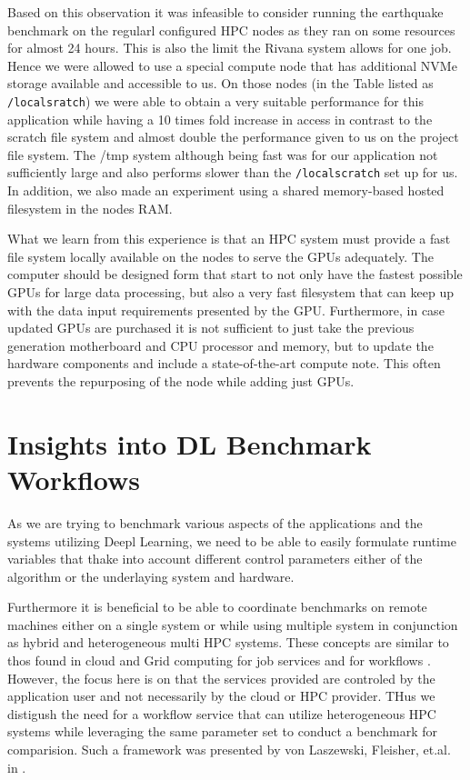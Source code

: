 \documentclass[utf8]{FrontiersinVancouver} %
\begin{document}
Based on this observation it was infeasible to consider running the
earthquake benchmark on the regularl configured HPC nodes as they ran
on some resources for almost 24 hours. This is also the limit the
Rivana system allows for one job. Hence we were allowed to use a
special compute node that has additional NVMe storage available and
accessible to us. On those nodes (in the Table listed as
\verb|/localsratch|) we were able to obtain a very suitable performance
for this application while having a 10 times fold increase in access in
contrast to the scratch file system and almost double the performance
given to us on the project file system. The /tmp system although being
fast was for our application not sufficiently large and also performs
slower than the \verb|/localscratch| set up for us. In addition, we
also made an experiment using a shared memory-based hosted filesystem
in the nodes RAM.

What we learn from this experience is that an HPC system must provide
a fast file system locally available on the nodes to serve the GPUs
adequately. The computer should be designed form that start to not
only have the fastest possible GPUs for large data processing, but
also a very fast filesystem that can keep up with the data input
requirements presented by the GPU. Furthermore, in case updated GPUs
are purchased it is not sufficient to just take the previous
generation motherboard and CPU processor and memory, but to update the
hardware components and include a state-of-the-art compute note. This
often prevents the repurposing of the node while adding just GPUs.

  


\section{Insights into DL Benchmark Workflows}
\label{sec:workflow-main}

As we are trying to benchmark various aspects of the applications and
the systems utilizing Deepl Learning, we need to be able to easily
formulate runtime variables that thake into account different control
parameters either of the algorithm or the underlaying system and
hardware.

Furthermore it is beneficial to be able to coordinate benchmarks on
remote machines either on a single system or while using multiple
system in conjunction as hybrid and heterogeneous multi HPC
systems. These concepts are similar to thos found in cloud and Grid
computing for job services \citep{las-infogram} and for workflows
\citep{las-workflow,las07-workflow}. However, the focus here is on
that the services provided are controled by the application user and
not necessarily by the cloud or HPC provider. THus we distigush the
need for a workflow service that can utilize heterogeneous HPC systems
while leveraging the same parameter set to conduct a benchmark for
comparision. Such a framework was presented by von Laszewski,
Fleisher, et.al. in \citep{las-22-arxiv-workflow-cc}.
\end{document}
